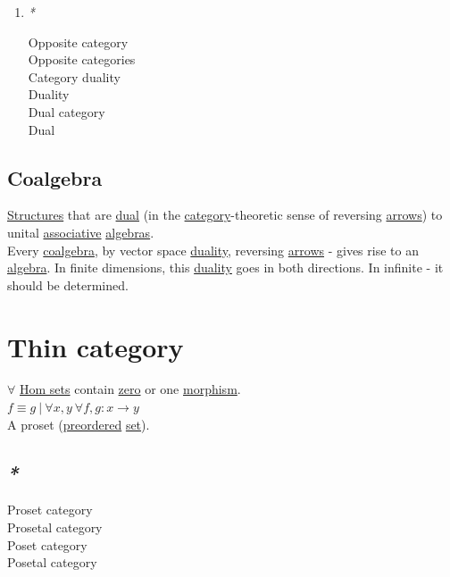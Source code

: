 \documentclass[a4paper,14pt,oneside]{book}
\begin{document}
\begin{enumerate}
\item \emph{*}
\label{sec:orgd6d5e4b}

\label{org6006804}Opposite category\\
\label{org8ef3b19}Opposite categories\\
\label{orgf64b7f4}Category duality\\
\label{org141c600}Duality\\
\label{orgdc0bea8}Dual category\\
\label{orgc09a559}Dual\\
\end{enumerate}

\subsection{\label{org57eb143}Coalgebra}
\label{sec:orgb0b6b0c}
\hyperref[org7fa289b]{Structures} that are \hyperref[orgc09a559]{dual} (in the \hyperref[org74d6ac5]{category}-theoretic sense of reversing \hyperref[org94bcc2e]{arrows}) to unital \hyperref[org9b6c0b8]{associative} \hyperref[org502da10]{algebras}.\\
Every \hyperref[org57eb143]{coalgebra}, by vector space \hyperref[org141c600]{duality}, reversing \hyperref[org94bcc2e]{arrows} - gives rise to an \hyperref[orga3cc81c]{algebra}. In finite dimensions, this \hyperref[org141c600]{duality} goes in both directions. In infinite - it should be determined.\\

\section{\label{org0e19f08}Thin category}
\label{sec:orgcecf386}
\(\forall\) \hyperref[orge39ae83]{Hom sets} contain \hyperref[org6c52cc9]{zero} or one \hyperref[orga7d420f]{morphism}.\\

\(f \equiv g \ | \ \forall x,y \ \forall f,g: x \to y\)\\

A proset (\hyperref[orgd9bf00e]{preordered} \hyperref[org2ca93d9]{set}).\\

\subsection{\emph{*}}
\label{sec:org37f214f}

\label{org7d8dbe1}Proset category\\
\label{org50b06a6}Prosetal category\\
\label{org40593c6}Poset category\\
\label{org3a1c3c1}Posetal category\\
\end{document}
